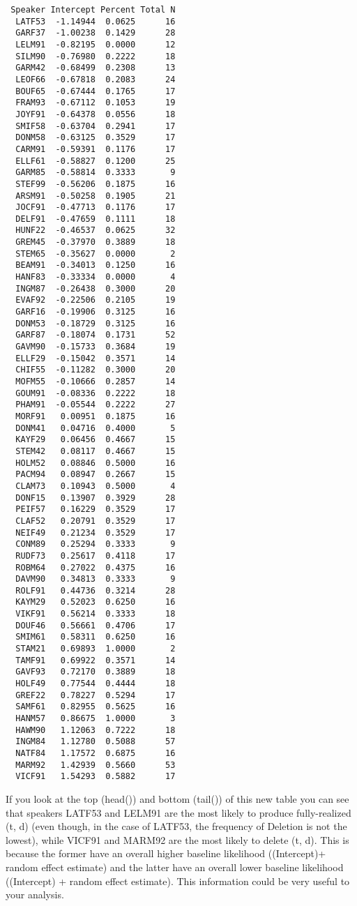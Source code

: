 \documentclass[
  10pt,
  letterpaper]{article}
\renewcommand\texttt[1]{{\ttfamily\color{BrickRed}#1}}
\begin{document}
\begin{verbatim}
 Speaker Intercept Percent Total N
  LATF53  -1.14944  0.0625      16
  GARF37  -1.00238  0.1429      28
  LELM91  -0.82195  0.0000      12
  SILM90  -0.76980  0.2222      18
  GARM42  -0.68499  0.2308      13
  LEOF66  -0.67818  0.2083      24
  BOUF65  -0.67444  0.1765      17
  FRAM93  -0.67112  0.1053      19
  JOYF91  -0.64378  0.0556      18
  SMIF58  -0.63704  0.2941      17
  DONM58  -0.63125  0.3529      17
  CARM91  -0.59391  0.1176      17
  ELLF61  -0.58827  0.1200      25
  GARM85  -0.58814  0.3333       9
  STEF99  -0.56206  0.1875      16
  ARSM91  -0.50258  0.1905      21
  JOCF91  -0.47713  0.1176      17
  DELF91  -0.47659  0.1111      18
  HUNF22  -0.46537  0.0625      32
  GREM45  -0.37970  0.3889      18
  STEM65  -0.35627  0.0000       2
  BEAM91  -0.34013  0.1250      16
  HANF83  -0.33334  0.0000       4
  INGM87  -0.26438  0.3000      20
  EVAF92  -0.22506  0.2105      19
  GARF16  -0.19906  0.3125      16
  DONM53  -0.18729  0.3125      16
  GARF87  -0.18074  0.1731      52
  GAVM90  -0.15733  0.3684      19
  ELLF29  -0.15042  0.3571      14
  CHIF55  -0.11282  0.3000      20
  MOFM55  -0.10666  0.2857      14
  GOUM91  -0.08336  0.2222      18
  PHAM91  -0.05544  0.2222      27
  MORF91   0.00951  0.1875      16
  DONM41   0.04716  0.4000       5
  KAYF29   0.06456  0.4667      15
  STEM42   0.08117  0.4667      15
  HOLM52   0.08846  0.5000      16
  PACM94   0.08947  0.2667      15
  CLAM73   0.10943  0.5000       4
  DONF15   0.13907  0.3929      28
  PEIF57   0.16229  0.3529      17
  CLAF52   0.20791  0.3529      17
  NEIF49   0.21234  0.3529      17
  CONM89   0.25294  0.3333       9
  RUDF73   0.25617  0.4118      17
  ROBM64   0.27022  0.4375      16
  DAVM90   0.34813  0.3333       9
  ROLF91   0.44736  0.3214      28
  KAYM29   0.52023  0.6250      16
  VIKF91   0.56214  0.3333      18
  DOUF46   0.56661  0.4706      17
  SMIM61   0.58311  0.6250      16
  STAM21   0.69893  1.0000       2
  TAMF91   0.69922  0.3571      14
  GAVF93   0.72170  0.3889      18
  HOLF49   0.77544  0.4444      18
  GREF22   0.78227  0.5294      17
  SAMF61   0.82955  0.5625      16
  HANM57   0.86675  1.0000       3
  HAWM90   1.12063  0.7222      18
  INGM84   1.12780  0.5088      57
  NATF84   1.17572  0.6875      16
  MARM92   1.42939  0.5660      53
  VICF91   1.54293  0.5882      17
\end{verbatim}

If you look at the top (\texttt{head()}) and bottom (\texttt{tail()}) of
this new table you can see that speakers \texttt{LATF53} and
\texttt{LELM91} are the most likely to produce fully-realized (t, d)
(even though, in the case of \texttt{LATF53}, the frequency of
\texttt{Deletion} is not the lowest), while \texttt{VICF91} and
\texttt{MARM92} are the most likely to delete (t, d). This is because
the former have an overall higher baseline likelihood
(\texttt{(Intercept)}+ random effect estimate) and the latter have an
overall lower baseline likelihood (\texttt{(Intercept)} + random effect
estimate). This information could be very useful to your analysis.
\end{document}
